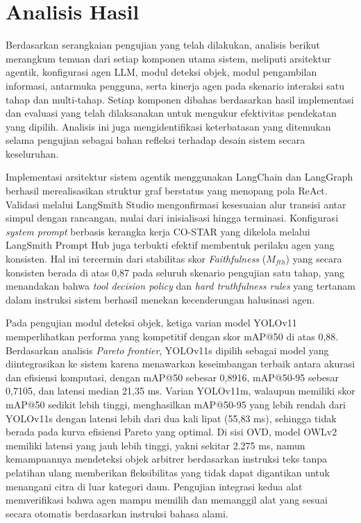 \section{Analisis Hasil}
Berdasarkan serangkaian pengujian yang telah dilakukan, analisis berikut merangkum temuan dari setiap komponen utama sistem, meliputi arsitektur agentik, konfigurasi agen LLM, modul deteksi objek, modul pengambilan informasi, antarmuka pengguna, serta kinerja agen pada skenario interaksi satu tahap dan multi-tahap. Setiap komponen dibahas berdasarkan hasil implementasi dan evaluasi yang telah dilaksanakan untuk mengukur efektivitas pendekatan yang dipilih. Analisis ini juga mengidentifikasi keterbatasan yang ditemukan selama pengujian sebagai bahan refleksi terhadap desain sistem secara keseluruhan.

Implementasi arsitektur sistem agentik menggunakan LangChain dan LangGraph berhasil merealisasikan struktur graf berstatus yang menopang pola ReAct. Validasi melalui LangSmith Studio mengonfirmasi kesesuaian alur transisi antar simpul dengan rancangan, mulai dari inisialisasi hingga terminasi. Konfigurasi \textit{system prompt} berbasis kerangka kerja CO-STAR yang dikelola melalui LangSmith Prompt Hub juga terbukti efektif membentuk perilaku agen yang konsisten. Hal ini tercermin dari stabilitas skor \textit{Faithfulness} ($M_{fth}$) yang secara konsisten berada di atas 0,87 pada seluruh skenario pengujian satu tahap, yang menandakan bahwa \textit{tool decision policy} dan \textit{hard truthfulness rules} yang tertanam dalam instruksi sistem berhasil menekan kecenderungan halusinasi agen.

Pada pengujian modul deteksi objek, ketiga varian model YOLOv11 memperlihatkan performa yang kompetitif dengan skor mAP@50 di atas 0,88. Berdasarkan analisis \textit{Pareto frontier}, YOLOv11s dipilih sebagai model yang diintegrasikan ke sistem karena menawarkan keseimbangan terbaik antara akurasi dan efisiensi komputasi, dengan mAP@50 sebesar 0,8916, mAP@50-95 sebesar 0,7105, dan latensi median 21,35 ms. Varian YOLOv11m, walaupun memiliki skor mAP@50 sedikit lebih tinggi, menghasilkan mAP@50-95 yang lebih rendah dari YOLOv11s dengan latensi lebih dari dua kali lipat (55,83 ms), sehingga tidak berada pada kurva efisiensi Pareto yang optimal. Di sisi OVD, model OWLv2 memiliki latensi yang jauh lebih tinggi, yakni sekitar 2.275 ms, namun kemampuannya mendeteksi objek arbitrer berdasarkan instruksi teks tanpa pelatihan ulang memberikan fleksibilitas yang tidak dapat digantikan untuk menangani citra di luar kategori daun. Pengujian integrasi kedua alat memverifikasi bahwa agen mampu memilih dan memanggil alat yang sesuai secara otomatis berdasarkan instruksi bahasa alami.

